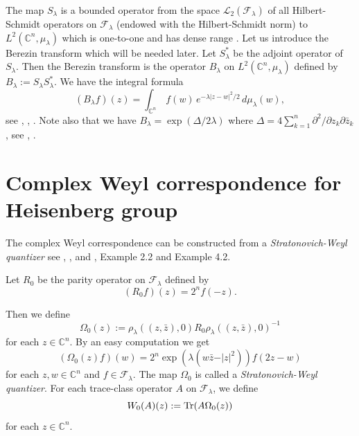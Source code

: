 \documentclass[12pt]{amsart}
\numberwithin{equation}{section}
\begin{document}
The map $S_{\lambda}$ is a bounded operator from the
space ${\mathcal L}_2({\mathcal F}_{\lambda})$ of all Hilbert-Schmidt operators
on ${\mathcal F}_{\lambda}$ (endowed with the
Hilbert-Schmidt norm) to $L^2({\mathbb C}^n,\mu_{\lambda})$  which
is one-to-one and has dense range \cite{UU}. Let us introduce the Berezin transform which will be needed later. Let $S_{\lambda}^{\ast}$ be the adjoint operator of $S_{\lambda}$.
Then
the Berezin transform is the operator $B_{\lambda}$
on $L^2({\mathbb C}^n,\mu_{\lambda})$ defined by $B_{\lambda}:=S_{\lambda}S_{\lambda}^{\ast}$.
We have the integral formula
\begin{equation*}(B_{\lambda}f)(z)=\int_{{\mathbb C}^n}\,f(w)
\,e^{ -\lambda\vert z-w\vert^2/2}\,d\mu_{\lambda}(w),\end{equation*}
see \cite{Be1}, \cite{Be2}, \cite{UU}.
Note also that we have $B_{\lambda}=\exp (\Delta/2\lambda)$ where
$\Delta=4\sum_{k=1}^n\partial^2/\partial z_k\partial {\bar z}_k$,
see \cite{UU}, \cite{Luo}.


\section{Complex Weyl correspondence for Heisenberg group} \label{sec:3}

The complex Weyl correspondence can be constructed from a \textit{Stratonovich-Weyl quantizer}
see \cite{St}, \cite{GB}, \cite{CaTo} and \cite{AU1}, Example 2.2 and Example 4.2.


Let $R_0$ be the parity operator on ${\mathcal F}_{\lambda}$ defined by
\begin{equation*}(R_0f)(z)=2^nf(-z). \end{equation*}

Then we define
\begin{equation*}\Omega_0(z):=\rho_{\lambda}((z,{\bar z}),0)R_0\rho_{\lambda}((z,{\bar z}),0)^{-1} \end{equation*} for each $z\in {\mathbb C}^n$. 
By an easy computation we get
\begin{equation}\label{eq:om}(\Omega_0(z)f)(w)=2^n\exp \left({\lambda}(w{\bar z}-\vert z\vert^2)\right) f(2z-w) \end{equation}
for each $z, w\in {\mathbb C}^n$ and $f\in {\mathcal F}_{\lambda}$. 
The map $\Omega_0$ is called a \textit{Stratonovich-Weyl quantizer}.
For each trace-class operator $A$ on ${\mathcal F}_{\lambda}$, we define 
\begin{equation*} W_0(A)(z):=\operatorname{Tr}(A\Omega_0(z))\end{equation*}
for each $z \in {\mathbb C}^n$.
\end{document}
